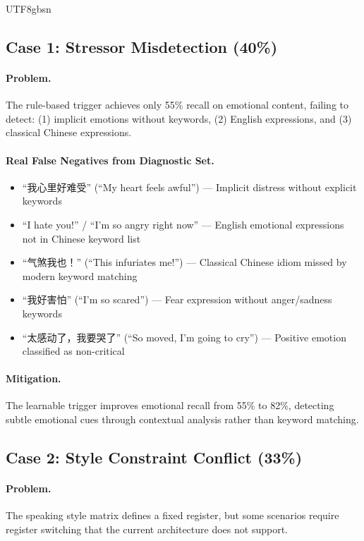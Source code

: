 \documentclass[11pt]{article}
\begin{document}
\begin{CJK*}{UTF8}{gbsn}
\subsection{Case 1: Stressor Misdetection (40\%)}

\paragraph{Problem.} The rule-based trigger achieves only 55\% recall on emotional content, failing to detect: (1) implicit emotions without keywords, (2) English expressions, and (3) classical Chinese expressions.

\paragraph{Real False Negatives from Diagnostic Set.}
\begin{itemize}
    \item ``我心里好难受'' (``My heart feels awful'') --- Implicit distress without explicit keywords
    \item ``I hate you!'' / ``I'm so angry right now'' --- English emotional expressions not in Chinese keyword list
    \item ``气煞我也！'' (``This infuriates me!'') --- Classical Chinese idiom missed by modern keyword matching
    \item ``我好害怕'' (``I'm so scared'') --- Fear expression without anger/sadness keywords
    \item ``太感动了，我要哭了'' (``So moved, I'm going to cry'') --- Positive emotion classified as non-critical
\end{itemize}

\paragraph{Mitigation.} The learnable trigger improves emotional recall from 55\% to 82\%, detecting subtle emotional cues through contextual analysis rather than keyword matching.

\subsection{Case 2: Style Constraint Conflict (33\%)}

\paragraph{Problem.} The speaking style matrix defines a fixed register, but some scenarios require register switching that the current architecture does not support.


\end{CJK*}
\end{document}

